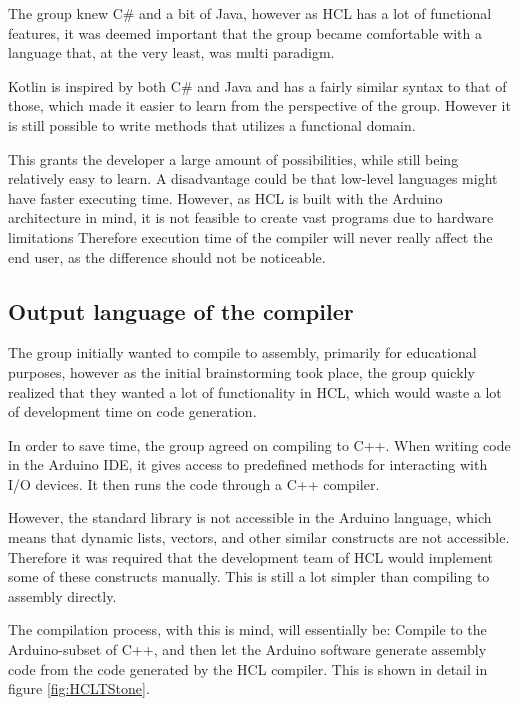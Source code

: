 The group knew C\# and a bit of Java, however as HCL has a lot of functional features, it was deemed important that the group became comfortable with a language that, at the very least, was multi paradigm.

Kotlin is inspired by both C\# and Java and has a fairly similar syntax to that of those, which made it easier to learn from the perspective of the group.
However it is still possible to write methods that utilizes a functional domain.

This grants the developer a large amount of possibilities, while still being relatively easy to learn.
A disadvantage could be that low-level languages might have faster executing time. 
However, as HCL is built with the Arduino architecture in mind, it is not feasible to create vast programs due to hardware limitations
Therefore execution time of the compiler will never really affect the end user, as the difference should not be noticeable.

\subsection{Output language of the compiler}
The group initially wanted to compile to assembly, primarily for educational purposes, however as the initial brainstorming took place, the group quickly realized that they wanted a lot of functionality in HCL, which would waste a lot of development time on code generation.

In order to save time, the group agreed on compiling to C++.
When writing code in the Arduino IDE, it gives access to predefined methods for interacting with I/O devices.
It then runs the code through a C++ compiler\cite{ArFAQ}.

However, the standard library is not accessible in the Arduino language, which means that dynamic lists, vectors, and other similar constructs are not accessible.
Therefore it was required that the development team of HCL would implement some of these constructs manually.
This is still a lot simpler than compiling to assembly directly. 

The compilation process, with this is mind, will essentially be: Compile to the Arduino-subset of C++, and then let the Arduino software generate assembly code from the code generated by the HCL compiler.
This is shown in detail in figure \ref{fig:HCLTStone}.


